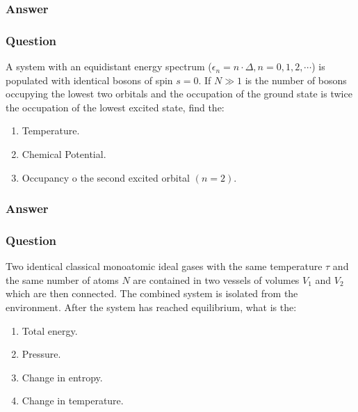 \subsubsection{Answer}

\subsubsection{Question}
A system with an equidistant energy spectrum ($\epsilon_n = n\cdot\Delta,n=0,1,2,\cdots$) is populated with identical bosons of spin $s = 0$. If $N \gg 1$ is the number of bosons occupying the lowest two orbitals and the occupation of the ground state is twice the occupation of the lowest excited state, find the:
\begin{enumerate}
	\item Temperature.
	\item Chemical Potential.
	\item Occupancy o the second excited orbital $(n=2)$. 
\end{enumerate}
\subsubsection{Answer}



\subsubsection{Question}
Two identical classical monoatomic ideal gases with the same temperature $\tau$ and the same number of atoms $N$ are contained in two vessels of volumes $V_1$ and $V_2$ which are then connected. The combined system is isolated from the environment. After the system has reached equilibrium, what is the:
\begin{enumerate}
	\item Total energy.
	\item Pressure.
	\item Change in entropy.
	\item Change in temperature. 
\end{enumerate}

